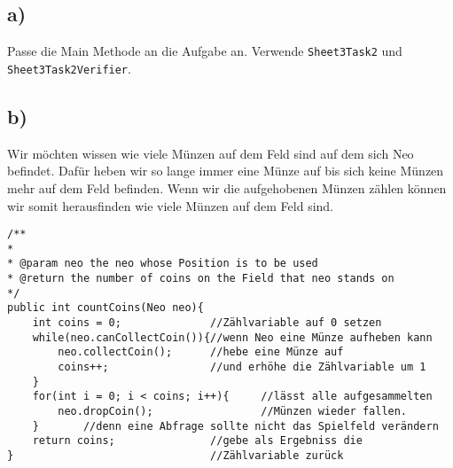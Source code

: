 	\subsection*{a)}
		Passe die Main Methode an die Aufgabe an. Verwende \lstinline{Sheet3Task2} und \lstinline{Sheet3Task2Verifier}.
	\subsection*{b)}
		Wir möchten wissen wie viele Münzen auf dem Feld sind auf dem sich Neo befindet. Dafür heben wir so lange immer eine Münze auf bis sich keine Münzen mehr auf dem Feld befinden. Wenn wir die aufgehobenen Münzen zählen können wir somit 				herausfinden wie viele Münzen auf dem Feld sind.
		\begin{lstlisting}
/**
*
* @param neo the neo whose Position is to be used
* @return the number of coins on the Field that neo stands on
*/
public int countCoins(Neo neo){
	int coins = 0;				//Zählvariable auf 0 setzen
	while(neo.canCollectCoin()){//wenn Neo eine Münze aufheben kann
		neo.collectCoin();		//hebe eine Münze auf
		coins++;				//und erhöhe die Zählvariable um 1
	}
	for(int i = 0; i < coins; i++){ 	//lässt alle aufgesammelten
		neo.dropCoin();					//Münzen wieder fallen.
	}		//denn eine Abfrage sollte nicht das Spielfeld verändern
	return coins;				//gebe als Ergebniss die 
}								//Zählvariable zurück
\end{lstlisting}

